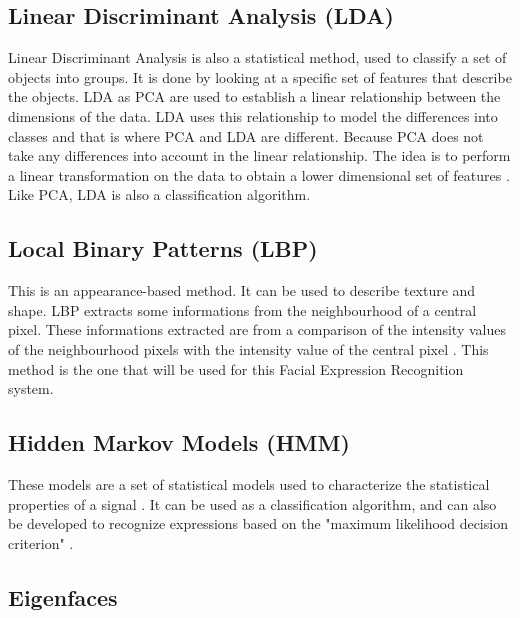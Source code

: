 \subsection{Linear Discriminant Analysis (LDA)}

\vspace{\baselineskip}
\noindent Linear Discriminant Analysis is also a statistical method, used to classify a set of objects into groups. It is done by looking at a specific set of features that describe the objects. LDA as PCA are used to establish a linear relationship between the dimensions of the data. LDA uses this relationship to model the differences into classes and that is where PCA and LDA are different. Because PCA does not take any differences into account in the linear relationship. The idea is to perform a linear transformation on the data to obtain a lower dimensional set of features \cite{GAN08}. Like PCA, LDA is also a classification algorithm.
\newline

\subsection{Local Binary Patterns (LBP)}

\vspace{\baselineskip}
\noindent This is an appearance-based method. It can be used to describe texture and shape. LBP extracts some informations from the neighbourhood of a central pixel. These informations extracted are from a comparison of the intensity values of the neighbourhood pixels with the intensity value of the central pixel \cite{GAN08}. This method is the one that will be used for this Facial Expression Recognition system.
\newline

\subsection{Hidden Markov Models (HMM)}

\vspace{\baselineskip}
\noindent These models are a set of statistical models used to characterize the statistical properties of a signal \cite{RAB93}. It can be used as a classification algorithm, and can also be developed to recognize expressions based on the "maximum likelihood decision criterion" \cite{LIE98}.
\newline

\subsection{Eigenfaces}


